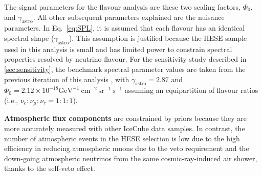 The signal parameters for the flavour analysis are these two scaling factors, $\Phi_{\mathrm{0}}$, and $\gamma_{\mathrm{astro}}$. All other subsequent parameters explained are the nuisance parameters. In Eq.~\ref{eq:SPL}, it is assumed that each flavour has an identical spectral shape ($\gamma_{\mathrm{astro}}$). This assumption is justified because the HESE sample used in this analysis is small and has limited power to constrain spectral properties resolved by neutrino flavour. For the sensitivity study described in \ref{sec:sensitivity}, the benchmark spectral parameter values are taken from the previous iteration of this analysis , with $\gamma_{\mathrm{astro}} = 2.87$ and $\Phi_{\mathrm{0}} = 2.12 \times 10^{-18} \mathrm{GeV}^{-1}\ \mathrm{cm}^{-2}\ \mathrm{sr}^{-1}\ \mathrm{s}^{-1}$ assuming an equipartition of flavour ratios (i.e., $\nu_e : \nu_{\mu} : \nu_{\tau} = 1:1:1$).

\textbf{Atmospheric flux components} are constrained by priors because they are more accurately measured with other IceCube data samples. In contrast, the number of atmospheric events in the HESE selection is low due to the high efficiency in reducing atmospheric muons due to the veto requirement and the down-going atmospheric neutrinos from the same cosmic-ray-induced air shower, thanks to the self-veto effect.

